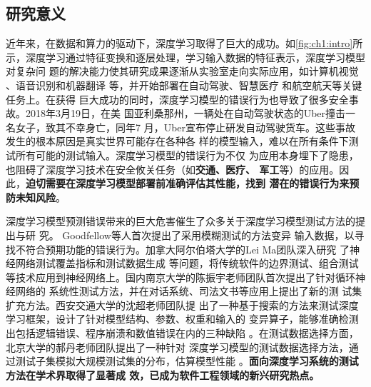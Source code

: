 
\subsection{研究意义}



%
近年来，在数据和算力的驱动下，深度学习取得了巨大的成功。如\cref{fig:ch1:intro}所
示，深度学习通过特征变换和逐层处理，学习输入数据的特征表示，深度学习模型对复杂问
题的解决能力使其研究成果逐渐从实验室走向实际应用，如计算机视觉
、语音识别和机器翻译
等，并开始部署在自动驾驶、智慧医疗
和航空航天等关键任务上。在获得
巨大成功的同时，深度学习模型的错误行为也导致了很多安全事故。2018年3月19日，在美
国亚利桑那州，一辆处在自动驾驶状态的Uber撞击一名女子，致其不幸身亡，同年7
月，Uber宣布停止研发自动驾驶货车。这些事故发生的根本原因是真实世界可能存在各种各
样的模型输入，难以在所有条件下测试所有可能的测试输入。深度学习模型的错误行为不仅
为应用本身埋下了隐患，也阻碍了深度学习技术在安全攸关任务（如\textbf{交通、医疗、
军工}等）的应用。因此，\textbf{迫切需要在深度学习模型部署前准确评估其性能，找到
潜在的错误行为来预防未知风险}。%




深度学习模型预测错误带来的巨大危害催生了众多关于深度学习模型测试方法的提出与研
究。 Goodfellow等人首次提出了采用模糊测试的方法变异
输入数据，以寻找不符合预期功能的错误行为。加拿大阿尔伯塔大学的Lei Ma团队深入研究
了神经网络测试覆盖指标和测试数据生成
等问题，将传统软件的边界测试、组合测试
等技术应用到神经网络上。国内南京大学的陈振宇老师团队首次提出了针对循环神经网络的
系统性测试方法，并在对话系统、司法文书等应用上提出了新的测
试集扩充方法。西安交通大学的沈超老师团队提
出了一种基于搜索的方法来测试深度学习框架，设计了针对模型结构、参数、权重和输入的
变异算子，能够准确检测出包括逻辑错误、程序崩溃和数值错误在内的三种缺陷
。在测试数据选择方面，北京大学的郝丹老师团队提出了一种针对
深度学习模型的测试数据选择方法，通过测试子集模拟大规模测试集的分布，估算模型性能
。\textbf{面向深度学习系统的测试方法在学术界取得了显著成
效，已成为软件工程领域的新兴研究热点。}

